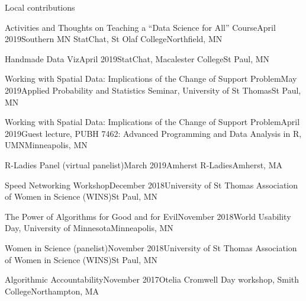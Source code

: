 \documentclass{resume} %
\begin{document}
\begin{rSection}{Local contributions}

\begin{sSubsection}{Activities and Thoughts on Teaching a ``Data Science for All'' Course}{}{April 2019}{Southern MN StatChat, St Olaf College}{Northfield, MN}
\end{sSubsection}

\begin{sSubsection}{Handmade Data Viz}{}{April 2019}{StatChat, Macalester College}{St Paul, MN}
\end{sSubsection}

\begin{sSubsection}{Working with Spatial Data: Implications of the Change of Support Problem}{}{May 2019}{Applied Probability and Statistics Seminar, University of St Thomas}{St Paul, MN}
\end{sSubsection}

\begin{sSubsection}{Working with Spatial Data: Implications of the Change of Support Problem}{}{April 2019}{Guest lecture, PUBH 7462: Advanced Programming and Data Analysis in R, UMN}{Minneapolis, MN}
\end{sSubsection}

\begin{sSubsection}{R-Ladies Panel}{ (virtual panelist)}{March 2019}{Amherst R-Ladies}{Amherst, MA}
\end{sSubsection}

\begin{sSubsection}{Speed Networking Workshop}{}{December 2018}{University of St Thomas Association of Women in Science (WINS)}{St Paul, MN}
\end{sSubsection}

\begin{sSubsection}{The Power of Algorithms for Good and for Evil}{}{November 2018}{World Usability Day, University of Minnesota}{Minneapolis, MN}
\end{sSubsection}

\begin{sSubsection}{Women in Science}{ (panelist)}{November 2018}{University of St Thomas Association of Women in Science (WINS)}{St Paul, MN}
\end{sSubsection}

\begin{sSubsection}{Algorithmic Accountability}{}{November 2017}{Otelia Cromwell Day workshop, Smith College}{Northampton, MA}
\end{sSubsection}


\end{rSection}
\end{document}
